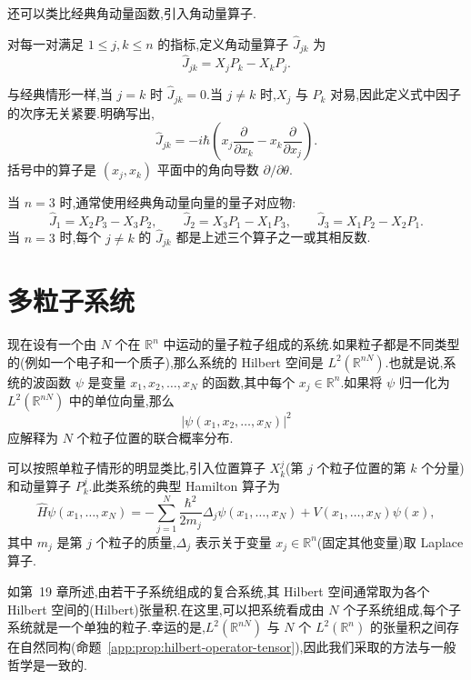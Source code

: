 还可以类比经典角动量函数,引入角动量算子.

\begin{definition}[角动量算子]\label{def:angular-momentum-operator}
对每一对满足 \(1\le j,k\le n\) 的指标,定义角动量算子 \(\widehat J_{jk}\) 为
\[
\widehat J_{jk}=X_{j}P_{k}-X_{k}P_{j}.
\]
\end{definition}

与经典情形一样,当 \(j=k\) 时 \(\widehat J_{jk}=0\).当 \(j\ne k\) 时,\(X_{j}\) 与 \(P_{k}\) 对易,因此定义式中因子的次序无关紧要.明确写出,
\[
\widehat J_{jk}=-i\hbar\left(x_{j}\frac{\partial}{\partial x_{k}}-x_{k}\frac{\partial}{\partial x_{j}}\right).
\]
括号中的算子是 \((x_{j},x_{k})\) 平面中的角向导数 \(\partial/\partial\theta\).

当 \(n=3\) 时,通常使用经典角动量向量的量子对应物:
\begin{equation}
\widehat J_{1}=X_{2}P_{3}-X_{3}P_{2},\qquad
\widehat J_{2}=X_{3}P_{1}-X_{1}P_{3},\qquad
\widehat J_{3}=X_{1}P_{2}-X_{2}P_{1}.
\label{eq:angular-momentum-three-quantum}
\end{equation}
当 \(n=3\) 时,每个 \(j\ne k\) 的 \(\widehat J_{jk}\) 都是上述三个算子之一或其相反数.

\section{多粒子系统}\label{sec:multiple-particles-distinguishable}

现在设有一个由 \(N\) 个在 \(\mathbb{R}^{n}\) 中运动的量子粒子组成的系统.如果粒子都是不同类型的(例如一个电子和一个质子),那么系统的 Hilbert 空间是 \(L^{2}(\mathbb{R}^{nN})\).也就是说,系统的波函数 \(\psi\) 是变量 \(x_{1},x_{2},\ldots,x_{N}\) 的函数,其中每个 \(x_{j}\in\mathbb{R}^{n}\).如果将 \(\psi\) 归一化为 \(L^{2}(\mathbb{R}^{nN})\) 中的单位向量,那么
\[
|\psi(x_{1},x_{2},\ldots,x_{N})|^{2}
\]
应解释为 \(N\) 个粒子位置的联合概率分布.

可以按照单粒子情形的明显类比,引入位置算子 \(X_{k}^{j}\)(第 \(j\) 个粒子位置的第 \(k\) 个分量)和动量算子 \(P_{k}^{j}\).此类系统的典型 Hamilton 算子为
\[
\widehat H\psi(x_{1},\ldots,x_{N})
=-\sum_{j=1}^{N}\frac{\hbar^{2}}{2m_{j}}\Delta_{j}\psi(x_{1},\ldots,x_{N})
+V(x_{1},\ldots,x_{N})\psi(x),
\]
其中 \(m_{j}\) 是第 \(j\) 个粒子的质量,\(\Delta_{j}\) 表示关于变量 \(x_{j}\in\mathbb{R}^{n}\)(固定其他变量)取 Laplace 算子.

如第~19 章所述,由若干子系统组成的复合系统,其 Hilbert 空间通常取为各个 Hilbert 空间的(Hilbert)张量积.在这里,可以把系统看成由 \(N\) 个子系统组成,每个子系统就是一个单独的粒子.幸运的是,\(L^{2}(\mathbb{R}^{nN})\) 与 \(N\) 个 \(L^{2}(\mathbb{R}^{n})\) 的张量积之间存在自然同构(命题~\ref{app:prop:hilbert-operator-tensor}),因此我们采取的方法与一般哲学是一致的.

